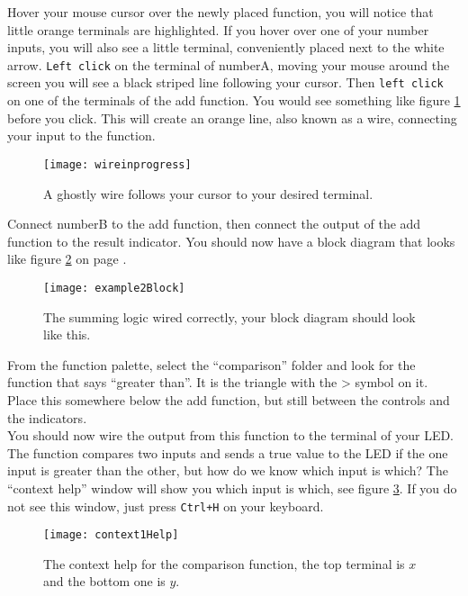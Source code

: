	Hover your mouse cursor over the newly placed function, you will notice that little orange terminals are highlighted. If you hover over one of your number inputs, you will also see a little terminal, conveniently placed next to the white arrow. \texttt{Left click} on the terminal of numberA, moving your mouse around the screen you will see a black striped line following your cursor. Then \texttt{left click} on one of the terminals of the add function. You would see something like figure \ref{wireinprogress} before you click. This will create an orange line, also known as a wire, connecting your input to the function.\\
	\begin{figure}
		\centering
		\texttt{[image: wireinprogress]}
		\caption{A ghostly wire follows your cursor to your desired terminal.}
		\label{wireinprogress}
	\end{figure}

	Connect numberB to the add function, then connect the output of the add function to the result indicator. You should now have a block diagram that looks like figure \ref{example2Block} on page \pageref{example2Block}.\\
		\begin{figure}
		\centering
		\texttt{[image: example2Block]}
		\caption{The summing logic wired correctly, your block diagram should look like this.}
		\label{example2Block}
	\end{figure}

	From the function palette, select the ``comparison'' folder and look for the function that says ``greater than''. It is the triangle with the > symbol on it. Place this somewhere below the add function, but still between the controls and the indicators.\\
	
	You should now wire the output from this function to the terminal of your LED. The function compares two inputs and sends a true value to the LED if the one input is greater than the other, but how do we know which input is which? The ``context help'' window will show you which input is which, see figure \ref{context1Help}. If you do not see this window, just press \texttt{Ctrl+H} on your keyboard.\\
	\begin{figure}
		\centering
		\texttt{[image: context1Help]}
		\caption{The context help for the comparison function, the top terminal is $x$ and the bottom one is $y$.}
		\label{context1Help}
	\end{figure}
	
